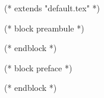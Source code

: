 
(* extends "default.tex" *)

(* block preambule *)
\usepackage{licence}
(* endblock *)

(* block preface *)
\newpage

\newpage
(* endblock *)

